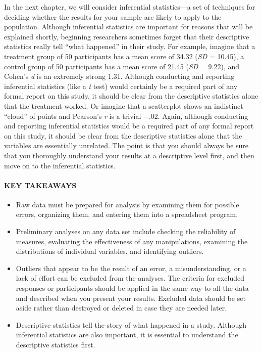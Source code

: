 \documentclass[
]{krantz}
\providecommand{\tightlist}{%
  \setlength{\itemsep}{0pt}\setlength{\parskip}{0pt}}
\begin{document}
In the next chapter, we will consider inferential statistics---a set of techniques for deciding whether the results for your sample are likely to apply to the population. Although inferential statistics are important for reasons that will be explained shortly, beginning researchers sometimes forget that their descriptive statistics really tell ``what happened'' in their study. For example, imagine that a treatment group of 50 participants has a mean score of 34.32 (\emph{SD} = 10.45), a control group of 50 participants has a mean score of 21.45 (\emph{SD} = 9.22), and Cohen's \emph{d} is an extremely strong 1.31. Although conducting and reporting inferential statistics (like a \emph{t} test) would certainly be a required part of any formal report on this study, it should be clear from the descriptive statistics alone that the treatment worked. Or imagine that a scatterplot shows an indistinct ``cloud'' of points and Pearson's \emph{r} is a trivial −.02. Again, although conducting and reporting inferential statistics would be a required part of any formal report on this study, it should be clear from the descriptive statistics alone that the variables are essentially unrelated. The point is that you should always be sure that you thoroughly understand your results at a descriptive level first, and then move on to the inferential statistics.

\hypertarget{key-takeaways-37}{%
\paragraph*{KEY TAKEAWAYS}\label{key-takeaways-37}}

\begin{itemize}
\tightlist
\item
  Raw data must be prepared for analysis by examining them for possible errors, organizing them, and entering them into a spreadsheet program.
\item
  Preliminary analyses on any data set include checking the reliability of measures, evaluating the effectiveness of any manipulations, examining the distributions of individual variables, and identifying outliers.
\item
  Outliers that appear to be the result of an error, a misunderstanding, or a lack of effort can be excluded from the analyses. The criteria for excluded responses or participants should be applied in the same way to all the data and described when you present your results. Excluded data should be set aside rather than destroyed or deleted in case they are needed later.
\item
  Descriptive statistics tell the story of what happened in a study. Although inferential statistics are also important, it is essential to understand the descriptive statistics first.
\end{itemize}
\end{document}
